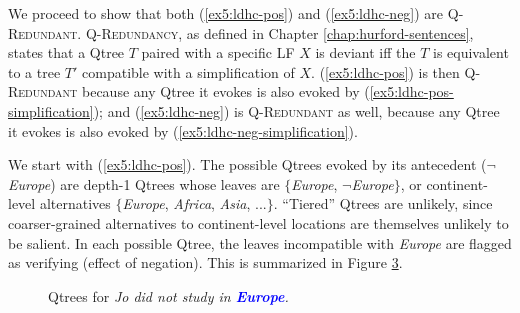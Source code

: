 We proceed to show that both (\ref{ex5:ldhc-pos}) and (\ref{ex5:ldhc-neg}) are \textsc{Q-Redundant}. \textsc{Q-Redundancy}, as defined in Chapter \ref{chap:hurford-sentences}, states that a Qtree $T$ paired with a specific LF $X$ is deviant iff the $T$ is equivalent to a tree $T'$ compatible with a simplification of $X$. (\ref{ex5:ldhc-pos}) is then \textsc{Q-Redundant} because any Qtree it evokes is also evoked by (\ref{ex5:ldhc-pos-simplification}); and (\ref{ex5:ldhc-neg}) is \textsc{Q-Redundant} as well, because any Qtree it evokes is also evoked by (\ref{ex5:ldhc-neg-simplification}).

\begin{exe}
	\ex\label{ex5:ldhc-simplifications}
	\begin{xlist}
		\label{ex5:ldhc-pos-simplification}
		\label{ex5:ldhc-neg-simplification}
	\end{xlist}
\end{exe}

We start with (\ref{ex5:ldhc-pos}). The possible Qtrees evoked by its antecedent ($\neg$\textit{Europe}) are depth-1 Qtrees whose leaves are $\lbrace$\textit{Europe}, $\neg$\textit{Europe}$\rbrace$, or continent-level alternatives $\lbrace$\textit{Europe}, \textit{Africa}, \textit{Asia}, ...$\rbrace$. ``Tiered'' Qtrees are unlikely, since coarser-grained alternatives to continent-level locations are themselves unlikely to be salient. In each possible Qtree, the leaves incompatible with \textit{Europe} are flagged as verifying (effect of negation). This is summarized in Figure \ref{trees:not-Europe}.

\begin{figure}[H]
	\centering
	\begin{subfigure}[b]{.3\linewidth}
		\centering
		\caption{}\label{tree:not-europe-polar}
	\end{subfigure}
	\qquad
	\begin{subfigure}[b]{.3\linewidth}
		\centering
		\caption{}\label{tree:not-europe-wh}
	\end{subfigure}
	\caption{Qtrees for \textit{Jo did not study in \textcolor{blue}{\textbf{Europe}}.}}\label{trees:not-Europe}
\end{figure}

